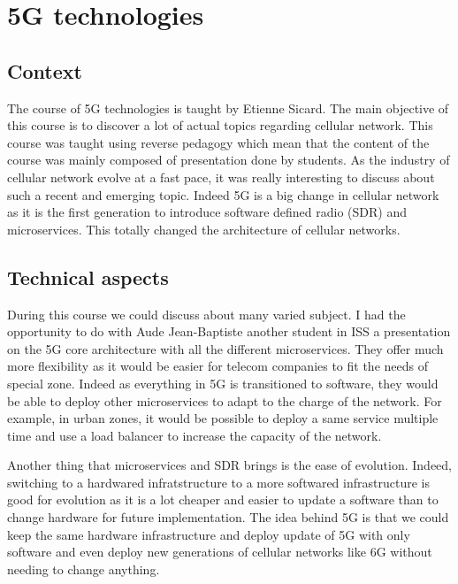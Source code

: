 \section{5G technologies}

\subsection{Context}

The course of 5G technologies is taught by Etienne Sicard. The main objective of this course is to discover a lot of actual topics regarding cellular network. This course was taught using reverse pedagogy which mean that the content of the course was mainly  composed of presentation done by students. As the industry of cellular network evolve at a fast pace, it was really interesting to discuss about such a recent and emerging topic. Indeed 5G is a big change in cellular network as it is the first generation to introduce software defined radio (SDR) and microservices. This totally changed the architecture of cellular networks.

\subsection{Technical aspects}

During this course we could discuss about many varied subject. I had the opportunity to do with Aude Jean-Baptiste another student in ISS a presentation on the 5G core architecture with all the different microservices. They offer much more flexibility as it would be easier for telecom companies to fit the needs of special zone. Indeed as everything in 5G is transitioned to software, they would be able to deploy other microservices to adapt to the charge of the network. For example, in urban zones, it would be possible to deploy a same service multiple time and use a load balancer to increase the capacity of the network. 
\smallskip

Another thing that microservices and SDR brings is the ease of evolution. Indeed, switching to a hardwared infratstructure to a more softwared infrastructure is good for evolution as it is a lot cheaper and easier to update a software than to change hardware for future implementation. The idea behind 5G is that we could keep the same hardware infrastructure and deploy update of 5G with only software and even deploy new generations of cellular networks like 6G without needing to change anything.
\smallskip

